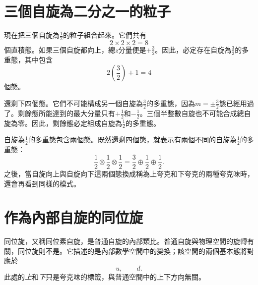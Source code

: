 \begin{classroomqa}
\end{classroomqa}

\section{三個自旋為二分之一的粒子}

現在把三個自旋為\(\tfrac12\)的粒子組合起來。它們共有
\begin{equation}
2\times2\times2=8
\end{equation}
個直積態。如果三個自旋都向上，總\(z\)分量便是\(+\tfrac32\)。因此，必定存在自旋為\(\tfrac32\)的多重態，其中包含
\begin{equation}
2\left(\frac32\right)+1=4
\end{equation}
個態。

還剩下四個態。它們不可能構成另一個自旋為\(\tfrac32\)的多重態，因為\(m=\pm\tfrac32\)態已經用過了。剩餘態所能達到的最大分量只有\(+\tfrac12\)和\(-\tfrac12\)。三個半整數自旋也不可能合成總自旋為零。因此，剩餘態必定組成自旋為\(\tfrac12\)的多重態。

自旋為\(\tfrac12\)的多重態包含兩個態。既然還剩四個態，就表示有兩個不同的自旋為\(\tfrac12\)的多重態：
\begin{equation}
\frac12\otimes\frac12\otimes\frac12
=
\frac32\oplus\frac12\oplus\frac12.
\end{equation}
之後，當自旋向上與自旋向下這兩個態換成稱為上夸克和下夸克的兩種夸克味時，還會再看到同樣的模式。

\section{作為內部自旋的同位旋}

同位旋，又稱同位素自旋，是普通自旋的內部類比。普通自旋與物理空間的旋轉有關，同位旋則不是。它描述的是內部數學空間中的變換；該空間的兩個基本態將對應於
\begin{equation}
u,\qquad d.
\end{equation}
此處的\emph{上}和\emph{下}只是夸克味的標籤，與普通空間中的上下方向無關。


